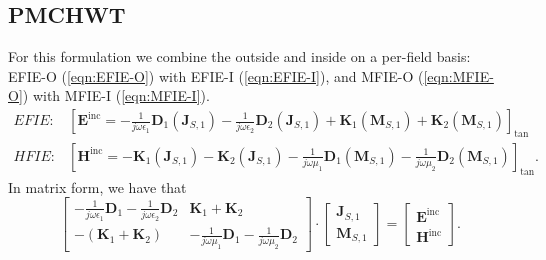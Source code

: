\documentclass[a4paper,10pt]{book}
\newcommand{\field}[1]{\mathbf{#1}}
\newcommand{\current}[1]{\mathbf{#1}}
\newcommand{\operator}[1]{\mathbf{#1}}
\begin{document}
\subsection{PMCHWT}
%
\par
For this formulation we combine the outside and inside on a per-field basis: EFIE-O (\ref{eqn:EFIE-O}) with EFIE-I (\ref{eqn:EFIE-I}), and MFIE-O (\ref{eqn:MFIE-O}) with MFIE-I (\ref{eqn:MFIE-I}).
\begin{eqnarray}
EFIE: & \boxed{
\left[\field{E}^\text{inc} =  -\frac{1}{j \omega \epsilon_1} \operator{D}_{1}\left(\current{J}_{S,1}\right) - \frac{1}{j \omega \epsilon_2} \operator{D}_{2}\left(\current{J}_{S,1}\right) + \operator{K}_{1}\left(\current{M}_{S,1}\right) + \operator{K}_{2}\left(\current{M}_{S,1}\right) \right]_\text{tan} } \\
HFIE: & \boxed{
\left[\field{H}^\text{inc} = - \operator{K}_{1}\left(\current{J}_{S,1}\right) - \operator{K}_{2}\left(\current{J}_{S,1}\right) - \frac{1}{j \omega \mu_1}\operator{D}_{1}\left(\current{M}_{S,1}\right) - \frac{1}{j \omega \mu_2}\operator{D}_{2}\left(\current{M}_{S,1}\right)  \right]_\text{tan} }.
\end{eqnarray}
In matrix form, we have that
\begin{equation}
\left[
\begin{matrix}
  -\frac{1}{j \omega \epsilon_1} \operator{D}_{1} - \frac{1}{j \omega \epsilon_2} \operator{D}_{2} & \operator{K}_{1} + \operator{K}_{2} \\
  -\left(\operator{K}_{1} + \operator{K}_{2} \right) & - \frac{1}{j \omega \mu_1}\operator{D}_{1} - \frac{1}{j \omega \mu_2}\operator{D}_{2}
\end{matrix}
\right]
\cdot 
\left[
\begin{matrix}
  \current{J}_{S,1} \\
  \current{M}_{S,1}  
\end{matrix}
\right]
=
\left[
\begin{matrix}
  \field{E}^\text{inc} \\
  \field{H}^\text{inc}
\end{matrix}
\right].
\end{equation}
\end{document}
